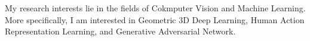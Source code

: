 


\begin{cventries}

\cvtext
{ %
\begin{cvitems}
    My research interests lie in the fields of Cokmputer Vision and Machine Learning. More specifically, I am interested in Geometric 3D Deep Learning, Human Action Representation Learning, and Generative Adversarial Network.
\end{cvitems}
}


\end{cventries}
